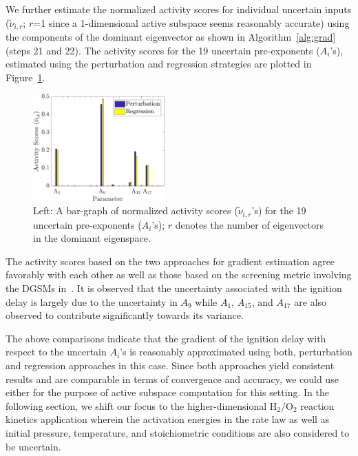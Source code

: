 We further estimate
the normalized activity scores for individual uncertain inputs ($\tilde{\nu}_{i,r}$; $r$=1 since a
1-dimensional active subspace seems reasonably accurate)
using the components of the dominant eigenvector as shown in Algorithm~\ref{alg:grad} (steps 21 and 22).
The activity scores for the 19 uncertain pre-exponents ($A_i$'s), estimated
using the perturbation and regression strategies are plotted in Figure~\ref{fig:comp_as}.  
%
\begin{figure}[htbp]
 \begin{center}
  \includegraphics[width=0.45\textwidth]{./Figures/comp_as19D}
\caption{Left: A bar-graph of normalized activity scores ($\tilde{\nu}_{i,r}$'s) 
for the 19 uncertain pre-exponents ($A_i$'s); $r$
denotes the number of eigenvectors in the dominant eigenspace.}
\label{fig:comp_as}
\end{center}
\end{figure}
%
The activity scores based on the two approaches for gradient estimation agree favorably 
with each other as well as those
based on the screening metric involving the DGSMs in~\cite{Vohra:2018}. It is observed that the uncertainty
associated with the ignition delay is largely due to the uncertainty in $A_9$ while $A_1$, $A_{15}$, and
$A_{17}$ are also observed to contribute significantly towards its variance.

The above comparisons indicate that the gradient of the ignition delay with respect to the
uncertain $A_i$'s is reasonably approximated using both, perturbation  and regression 
approaches in this case. Since both approaches yield consistent results and are
comparable in terms of convergence and accuracy, we could use either for the purpose
of active subspace computation for this setting.
In the following section, we shift our focus to 
the higher-dimensional H$_2$/O$_2$ reaction kinetics application wherein the activation
energies in the rate law as well as initial pressure, temperature, and stoichiometric conditions
are also considered to be uncertain.
